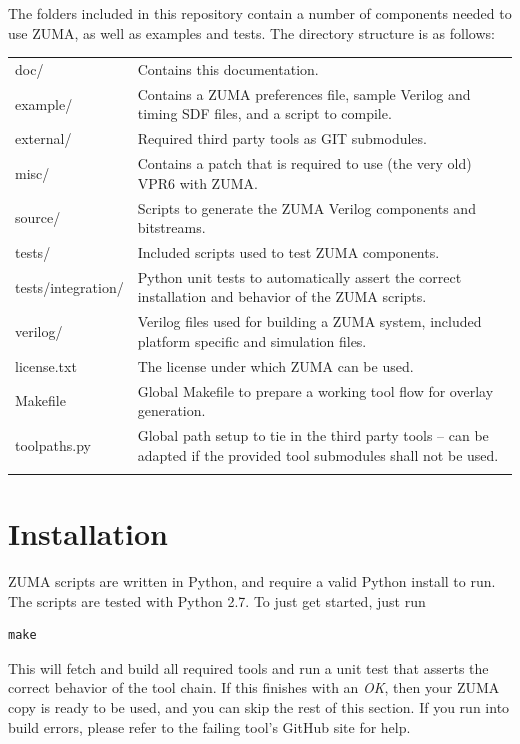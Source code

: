 \documentclass{article}
\begin{document}
\noindent The folders included in this repository contain a number of components needed to use ZUMA, as well as examples and tests.
The directory structure is as follows:\\[1.5mm]
\renewcommand{\arraystretch}{1.4}%
\begin{tabularx}{\textwidth}{lX}
    \hline 
    doc/               &  Contains this documentation.  \\
    example/           &  Contains a ZUMA preferences file, sample Verilog and timing SDF files, and a script to compile.  \\
    external/          &  Required third party tools as GIT submodules. \\
    misc/              &  Contains a patch that is required to use (the very old) VPR6 with ZUMA. \\
    source/            &  Scripts to generate the ZUMA Verilog components and bitstreams. \\
    tests/             &  Included scripts used to test ZUMA components. \\
    tests/integration/ &  Python unit tests to automatically assert the correct installation and behavior of the ZUMA scripts. \\
    verilog/           &  Verilog files used for building a ZUMA system, included platform specific and simulation files. \\
    license.txt        &  The license under which ZUMA can be used. \\
    Makefile           &  Global Makefile to prepare a working tool flow for overlay generation. \\
    toolpaths.py       &  Global path setup to tie in the third party tools -- can be adapted if the provided tool submodules shall not be used. \\
    \hline \\
\end{tabularx}











\clearpage
\section{Installation}
\label{sec:installation}
ZUMA scripts are written in Python, and require a valid Python install to run.
The scripts are tested with Python 2.7. To just get started, just run
\begin{verbatim}
make
\end{verbatim}
This will fetch and build all required tools and run a unit test that asserts the correct behavior of the tool chain. If this finishes with an \emph{OK}, then your ZUMA copy is ready to be used, and you can skip the rest of this section.
If you run into build errors, please refer to the failing tool's GitHub site for help.
\end{document}
